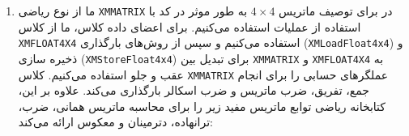 {\begin{spacing}{1.5}
\begin{enumerate}[label=\textbf{\arabic*}.]
            \item {ما از نوع ریاضی \texttt{XMMATRIX} در  برای توصیف ماتریس $4\times 4$ به طور موثر در کد با استفاده از عملیات  استفاده می‌کنیم.
            برای اعضای داده کلاس، ما از کلاس \texttt{XMFLOAT4X4} استفاده می‌کنیم و
            سپس از روش‌های بارگذاری (\texttt{XMLoadFloat4x4}) و ذخیره سازی (\texttt{XMStoreFloat4x4}) برای تبدیل بین \texttt{XMMATRIX} و \texttt{XMFLOAT4X4} به عقب و جلو استفاده می‌کنیم.
            کلاس \texttt{XMMATRIX} عملگرهای حسابی را برای انجام جمع، تفریق، ضرب ماتریس و ضرب اسکالر بارگذاری می‌کند.
            علاوه بر این، کتابخانه ریاضی  توابع ماتریس مفید زیر را برای محاسبه ماتریس همانی، ضرب، ترانهاده، دترمینان و معکوس ارائه می‌کند:
            \textbf{\vspace{6pt}}
            \lr{}
            }
        \end{enumerate}
    \end{spacing}
}
\newpage


